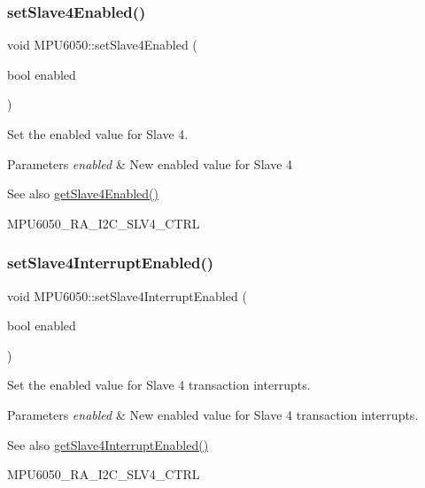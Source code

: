 \subsubsection{\texorpdfstring{setSlave4Enabled()}{setSlave4Enabled()}}
{\footnotesize\ttfamily void M\+P\+U6050\+::set\+Slave4\+Enabled (\begin{DoxyParamCaption}\item[{bool}]{enabled }\end{DoxyParamCaption})}

Set the enabled value for Slave 4. 
\begin{DoxyParams}{Parameters}
{\em enabled} & New enabled value for Slave 4 \\
\hline
\end{DoxyParams}
\begin{DoxySeeAlso}{See also}
\mbox{\hyperlink{class_m_p_u6050_a4b9e13d6776ba99e042773873557bedd}{get\+Slave4\+Enabled()}} 

M\+P\+U6050\+\_\+\+R\+A\+\_\+\+I2\+C\+\_\+\+S\+L\+V4\+\_\+\+C\+T\+RL 
\end{DoxySeeAlso}
\mbox{\label{class_m_p_u6050_a7d7498ebc26f8a1fe8c9dcf40cd5d265}} 
\subsubsection{\texorpdfstring{setSlave4InterruptEnabled()}{setSlave4InterruptEnabled()}}
{\footnotesize\ttfamily void M\+P\+U6050\+::set\+Slave4\+Interrupt\+Enabled (\begin{DoxyParamCaption}\item[{bool}]{enabled }\end{DoxyParamCaption})}

Set the enabled value for Slave 4 transaction interrupts. 
\begin{DoxyParams}{Parameters}
{\em enabled} & New enabled value for Slave 4 transaction interrupts. \\
\hline
\end{DoxyParams}
\begin{DoxySeeAlso}{See also}
\mbox{\hyperlink{class_m_p_u6050_a051549bcfa2eeb848c8557fc3efe74da}{get\+Slave4\+Interrupt\+Enabled()}} 

M\+P\+U6050\+\_\+\+R\+A\+\_\+\+I2\+C\+\_\+\+S\+L\+V4\+\_\+\+C\+T\+RL 
\end{DoxySeeAlso}
\mbox{\label{class_m_p_u6050_ac154934a43c599cdc564fb29c22c45eb}} 
